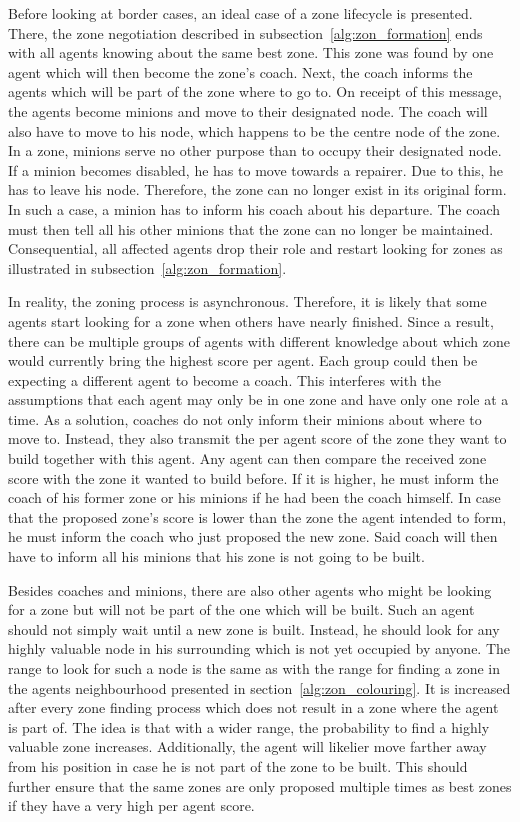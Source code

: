 Before looking at border cases, an ideal case of a zone lifecycle is presented. There, the zone negotiation described in subsection~\ref{alg:zon_formation} ends with all agents knowing about the same best zone. This zone was found by one agent which will then become the zone's coach. Next, the coach informs the agents which will be part of the zone where to go to. On receipt of this message, the agents become minions and move to their designated node. The coach will also have to move to his node, which happens to be the centre node of the zone.
In a zone, minions serve no other purpose than to occupy their designated node. If a minion becomes disabled, he has to move towards a repairer. Due to this, he has to leave his node. Therefore, the zone can no longer exist in its original form. In such a case, a minion has to inform his coach about his departure. The coach must then tell all his other minions that the zone can no longer be maintained. Consequential, all affected agents drop their role and restart looking for zones as illustrated in subsection~\ref{alg:zon_formation}.

In reality, the zoning process is asynchronous. Therefore, it is likely that some agents start looking for a zone when others have nearly finished. Since a result, there can be multiple groups of agents with different knowledge about which zone would currently bring the highest score per agent. Each group could then be expecting a different agent to become a coach. This interferes with the assumptions that each agent may only be in one zone and have only one role at a time. As a solution, coaches do not only inform their minions about where to move to. Instead, they also transmit the per agent score of the zone they want to build together with this agent. Any agent can then compare the received zone score with the zone it wanted to build before. If it is higher, he must inform the coach of his former zone or his minions if he had been the coach himself. In case that the proposed zone's score is lower than the zone the agent intended to form, he must inform the coach who just proposed the new zone. Said coach will then have to inform all his minions that his zone is not going to be built.

Besides coaches and minions, there are also other agents who might be looking for a zone but will not be part of the one which will be built. Such an agent should not simply wait until a new zone is built. Instead, he should look for any highly valuable node in his surrounding which is not yet occupied by anyone. The range to look for such a node is the same as with the range for finding a zone in the agents neighbourhood presented in section~\ref{alg:zon_colouring}. It is increased after every zone finding process which does not result in a zone where the agent is part of. The idea is that with a wider range, the probability to find a highly valuable zone increases. Additionally, the agent will likelier move farther away from his position in case he is not part of the zone to be built. This should further ensure that the same zones are only proposed multiple times as best zones if they have a very high per agent score.

